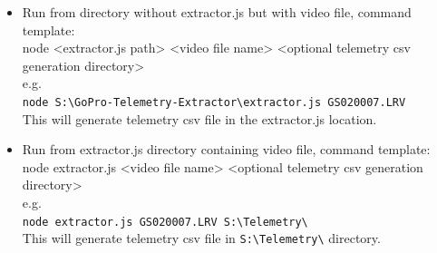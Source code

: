 \documentclass[a4paper,12pt]{book}
\begin{document}
\begin{enumerate}
\begin{itemize}
		This will generate telemetry csv file in \verb|S:\Telemetry\| directory.
		\item Run from directory without extractor.js but with video file, command template:\\
		node <extractor.js path> <video file name> <optional telemetry csv generation directory>\\
		e.g.\\
		\verb|node S:\GoPro-Telemetry-Extractor\extractor.js GS020007.LRV|\\
		
		This will generate telemetry csv file in the extractor.js location.
		\item Run from extractor.js directory containing video file, command template:\\
		node extractor.js <video file name> <optional telemetry csv generation directory>\\
		e.g.\\
		\verb|node extractor.js GS020007.LRV S:\Telemetry\|\\
		This will generate telemetry csv file in \verb|S:\Telemetry\| directory.		
	\end{itemize}
\end{enumerate}
 
\end{document}
